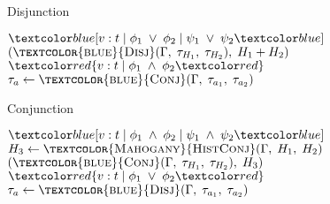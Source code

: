 \begin{algorithm}[ht]
    \caption{Disjunction}\label{alg:disj}
    \begin{algorithmic}[1]
                    \State \Return $\under{v: t \;|\; \phi_1 \;\lor\; \phi_2 \;|\; \psi_1 \;\lor\; \psi_2}$
                \EndCase
                    \State \Return $(\Call{\textcolor{blue}{Disj}}{\Gamma, \;\tau_{H_1}, \;\tau_{H_2}}, \;H_1 + H_2)$
                \EndCase
                    \State \Return $\overa{v: t \;|\; \phi_1 \;\land\; \phi_2}$
                \EndCase
                    \State $\tau_a \gets \Call{\textcolor{blue}{Conj}}{\Gamma, \;\tau_{a_1}, \;\tau_{a_2}}$
                    \State {}
                \EndCase
            \EndMatch
        \EndProcedure
    \end{algorithmic}
\end{algorithm}

\begin{algorithm}[ht]
    \caption{Conjunction}\label{alg:conj}
    \begin{algorithmic}[1]
                    \State \Return $\under{v: t \;|\; \phi_1 \;\land\; \phi_2 \;|\; \psi_1 \;\land\; \psi_2}$
                \EndCase
                    \State $H_3 \gets \Call{\textcolor{Mahogany}{HistConj}}{\Gamma, \;H_1, \;H_2}$
                        \State \Return \Failure
                    \Else
                        \State \Return $(\Call{\textcolor{blue}{Conj}}{\Gamma, \;\tau_{H_1}, \;\tau_{H_2}}, \;H_3)$
                    \EndIf
                \EndCase
                    \State \Return $\overa{v: t \;|\; \phi_1 \;\lor\; \phi_2}$
                \EndCase
                    \State $\tau_a \gets \Call{\textcolor{blue}{Disj}}{\Gamma, \;\tau_{a_1}, \;\tau_{a_2}}$
                    \State {}
                \EndCase
            \EndMatch
        \EndProcedure
    \end{algorithmic}
\end{algorithm}